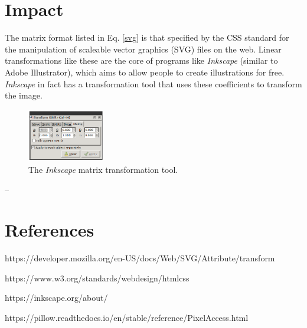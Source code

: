 \documentclass{article}
\begin{document}
\section{Impact} 

The matrix format listed in Eq. \ref{svg} is that specified by the CSS standard
for the manipulation of scaleable vector graphics (SVG) files on the web.
Linear transformations like these are the core of programs like
\textit{Inkscape} (similar to Adobe Illustrator), which aims to allow people to 
create illustrations for free. \textit{Inkscape} in fact has a transformation
tool that uses these coefficients to transform the image.

\begin{figure}[!htbp]
    \centering
    \includegraphics[width=0.3\textwidth]{inkscape}
    \caption{The \textit{Inkscape} matrix transformation tool.}
\end{figure}
    

--


\clearpage
\section{References} 

https://developer.mozilla.org/en-US/docs/Web/SVG/Attribute/transform

https://www.w3.org/standards/webdesign/htmlcss

https://inkscape.org/about/

https://pillow.readthedocs.io/en/stable/reference/PixelAccess.html
\end{document}
